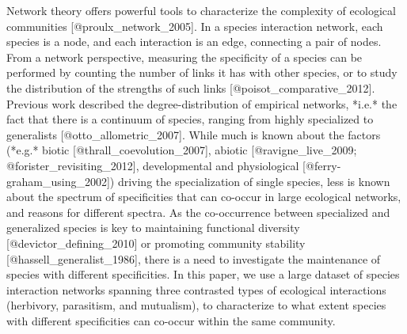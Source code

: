 Network theory offers powerful tools to characterize the complexity of
ecological communities [@proulx_network_2005]. In a species interaction
network, each species is a node, and each interaction is an edge, connecting
a pair of nodes. From a network perspective, measuring the specificity
of a species can be performed by counting the number of links it has with
other species, or to study the distribution of the strengths of such links
[@poisot_comparative_2012]. Previous work described the degree-distribution
of empirical networks, *i.e.* the fact that there is a continuum of species,
ranging from highly specialized to generalists [@otto_allometric_2007]. While
much is known about the factors (*e.g.* biotic [@thrall_coevolution_2007],
abiotic [@ravigne_live_2009; @forister_revisiting_2012], developmental and
physiological [@ferry-graham_using_2002]) driving the specialization of single
species, less is known about the spectrum of specificities that can co-occur
in large ecological networks, and reasons for different spectra. As the
co-occurrence between specialized and generalized species is key to maintaining
functional diversity [@devictor_defining_2010] or promoting community stability
[@hassell_generalist_1986], there is a need to investigate the maintenance of
species with different specificities. In this paper, we use a large dataset
of species interaction networks spanning three contrasted types of ecological
interactions (herbivory, parasitism, and mutualism), to characterize to what
extent species with different specificities can co-occur within the same community.
